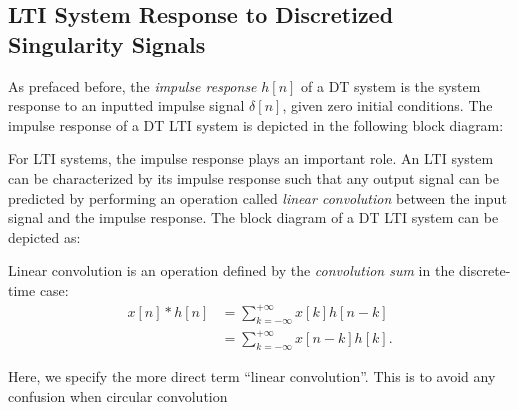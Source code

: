 \documentclass{report}
\begin{document}
\subsection{LTI System Response to Discretized Singularity Signals}
As prefaced before, the \emph{impulse response} $h[n]$ of a DT system is the system response to an inputted impulse signal $\delta[n]$, given zero initial conditions. 
The impulse response of a DT LTI system is depicted in the following block diagram:
\begin{center}
\end{center}
For LTI systems, the impulse response plays an important role. An LTI system can be characterized by its impulse response such that any output signal can be predicted by 
performing an operation called \emph{linear convolution} between the input signal and the impulse response. The block diagram of a DT LTI system can be depicted as:
\begin{center}
\end{center}
\begin{tcolorbox}[width=\textwidth,colback={white}, sharp corners]
    Linear convolution is an operation defined by the \emph{convolution sum} in the discrete-time case:
    \begin{align}
        x[n] * h[n] &= \sum_{k=-\infty}^{+\infty} x[k]h[n-k] \\
        &= \sum_{k=-\infty}^{+\infty} x[n-k]h[k].
    \end{align}
\end{tcolorbox}
Here, we specify the more direct term ``linear convolution''. This is to avoid any confusion when circular convolution 
\end{document}
